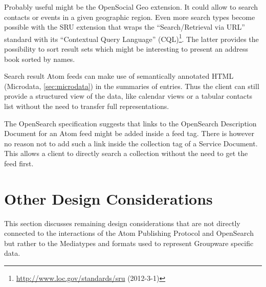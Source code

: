 \documentclass[11pt,a4paper,headsepline,twoside]{scrartcl}		%
\newcommand{\citeurl}[2]{\url{#1} (#2)}
\begin{document}
Probably useful might be the OpenSocial Geo extension. It could allow to search
contacts or events in a given geographic region. Even more search types become
possible with the SRU extension that wraps the ``Search/Retrieval via URL''
standard with its ``Contextual Query Language''
(CQL)\footnote{\citeurl{http://www.loc.gov/standards/sru}{2012-3-1}}. The latter
provides the possibility to sort result sets which might be interesting to
present an address book sorted by names.

Search result Atom feeds can make use of semantically annotated HTML (Microdata,
\autoref{sec:microdata}) in the summaries of entries. Thus the client can still
provide a structured view of the data, like calendar views or a tabular contacts
list without the need to transfer full representations.

The OpenSearch specification suggests that links to the OpenSearch Description
Document for an Atom feed might be added inside a feed tag. There is however no
reason not to add such a link inside the collection tag of a Service
Document. This allows a client to directly search a collection without the need
to get the feed first.




\section{Other Design Considerations}
\label{sec:design}

This section discusses remaining design considerations that are not directly
connected to the interactions of the Atom Publishing Protocol and OpenSearch but
rather to the Mediatypes and formats used to represent Groupware specific data.


\end{document}
